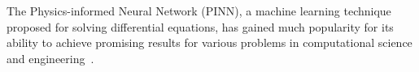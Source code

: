 

The Physics-informed Neural Network (PINN), a machine learning technique proposed for solving differential equations, has gained much popularity for its ability to achieve promising results for various problems in computational science and engineering~\cite{cai2022physics,misyris2020physics,cai2021physics,ji2021stiff,zanardi2022towards,lu2022deep,lv2021novel,sun2020surrogate,raissi2019deep,jin2021nsfnets,kissas2020machine,sahli2020physics}.

